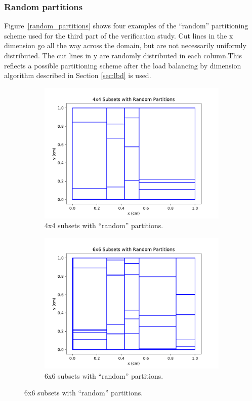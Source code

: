 \documentclass[times,final]{elsarticle}
\begin{document}
\subsubsection{Random partitions}
Figure~\ref{random_partitions} shows four examples of the ``random'' partitioning scheme used for the third part of the verification study. Cut lines in the x dimension go all the way across the domain, but are not necessarily uniformly distributed. The cut lines in y are randomly distributed in each column.This reflects a possible partitioning scheme after the load balancing by dimension algorithm described in Section \ref{sec:lbd} is used.
\begin{figure}[H]
\centering
\begin{subfigure}[b]{0.45\textwidth}
  \includegraphics[width=\textwidth]{../Dissertation/cut_line_files/4_random.pdf}
  \caption{4x4 subsets with ``random'' partitions.}
  \label{4random}
\end{subfigure}
\begin{subfigure}[b]{0.45\textwidth}
  \includegraphics[width=\textwidth]{../Dissertation/cut_line_files/6_random.pdf}
  \caption{6x6 subsets with ``random'' partitions.}
  \label{6random}
\end{subfigure}


\end{figure}
\end{document}

